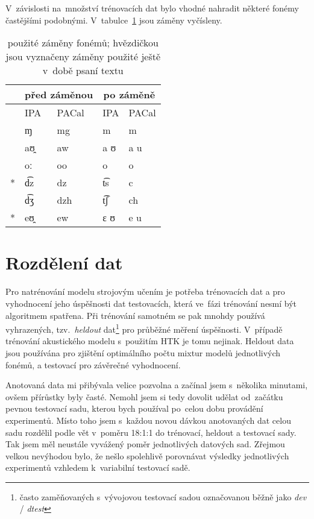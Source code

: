 V~závislosti na~množství trénovacích dat bylo vhodné nahradit některé fonémy
častějšími podobnými. V~tabulce~\ref{tab:phonesed} jsou záměny vyčísleny.
\begin{table}[htpb]
\begin{center}
\begin{tabular}{|r|l|l||l|l|}
\hline
&
\multicolumn{2}{|c||}{před záměnou} &
\multicolumn{2}{|c|}{po záměně} \\
\hline
& IPA & PACal & IPA & PACal \\
\hline
    & ɱ  & mg & m & m \\
    & aʊ̯ & aw & a ʊ & a u \\
    & oː & oo & o & o \\
\** & d͡z & dz & t͡s & c \\
    & d͡ʒ & dzh & t͡ʃ & ch \\
\** & eʊ̯ & ew & ɛ ʊ & e u \\
\hline
\end{tabular}
\caption{použité záměny fonémů; hvězdičkou jsou vyznačeny záměny použité ještě
v~době psaní textu}\label{tab:phonesed}
\end{center}
\end{table}
\normalfont

\section{Rozdělení dat}

Pro natrénování modelu strojovým učením je potřeba trénovacích dat a pro
vyhodnocení jeho úspěšnosti dat testovacích, která ve~fázi trénování nesmí být
algoritmem spatřena. Při trénování samotném se pak mnohdy používá vyhrazených,
tzv.~\textit{heldout} dat\footnote{často zaměňovaných s~vývojovou testovací sadou
označovanou běžně jako \textit{dev} / \textit{dtest}} pro průběžné měření úspěšnosti. V~případě trénování
akustického modelu s~použitím HTK je tomu nejinak. Heldout data jsou používána
pro zjištění optimálního počtu mixtur modelů jednotlivých fonémů, a testovací
pro závěrečné vyhodnocení.

Anotovaná data mi přibývala velice pozvolna a začínal jsem s~několika minutami,
ovšem přírůstky byly časté. Nemohl jsem si tedy dovolit udělat od~začátku pevnou
testovací sadu, kterou bych používal po~celou dobu provádění experimentů. Místo
toho jsem s~každou novou dávkou anotovaných dat celou sadu rozdělil podle vět
v~poměru 18:1:1 do trénovací, heldout a testovací sady. Tak jsem měl neustále
vyvážený poměr jednotlivých datových sad. Zřejmou velkou nevýhodou bylo, že
nešlo spolehlivě porovnávat výsledky jednotlivých experimentů vzhledem
k~variabilní testovací sadě.

